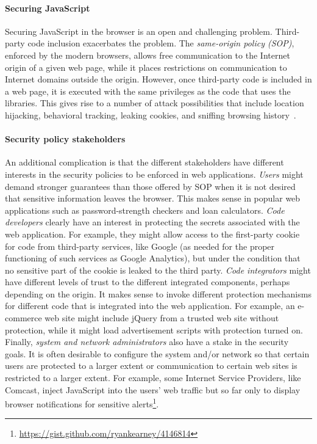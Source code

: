 \documentclass{llncs}
\begin{document}
\vspace{-.4cm}
\paragraph{Securing JavaScript}
Securing JavaScript in the browser is an open and challenging
problem. Third-party code inclusion exacerbates the
problem. The \emph{same-origin policy (SOP)}, enforced by the modern
browsers, allows free communication to the Internet origin of a given web page, 
while it
places restrictions on communication to Internet domains
outside the origin. However, once third-party code is
included in a web page, it is executed with the same privileges as the code
that uses the libraries. This gives rise to a number of attack
possibilities that
include
location
hijacking, behavioral tracking, leaking cookies, and sniffing browsing history~\cite{Jang+:CCS10}. 

\vspace{-.4cm}
\paragraph{Security policy stakeholders}
An additional complication is that the different stakeholders have
different interests in the security policies to be enforced
in web applications. 
%
\emph{Users} might demand stronger guarantees than those
offered by SOP when it is not desired that sensitive information leaves
the browser. This makes sense in popular web applications such as
password-strength checkers and loan
calculators.
%
\emph{Code developers} clearly have an interest in protecting the
secrets associated with the web application. For example, they might
allow access to the first-party cookie for code from third-party
services, like Google (as needed for the proper functioning of
such services
as Google Analytics), but under the condition that no sensitive part
of the cookie is leaked to the third party.
%
\emph{Code integrators} might have different levels of trust to the
different integrated components, perhaps depending on the origin. It
makes sense to invoke different protection mechanisms for 
different code that is integrated into the web application.
For example, an e-commerce web site might include jQuery from a trusted
web site without protection, while it might load advertisement scripts
with protection turned on. 
%
Finally, \emph{system and network administrators} also have a
stake in the security goals. It is often desirable to configure the
system and/or network so that certain users are protected to a larger
extent or communication to certain web sites is restricted to a larger
extent.
%
For example, some Internet Service Providers, like Comcast, inject
JavaScript into the users' web traffic but so far only to display browser
notifications for sensitive 
alerts\footnote{\scriptsize{\url{https://gist.github.com/ryankearney/4146814}}}. 
\end{document}

